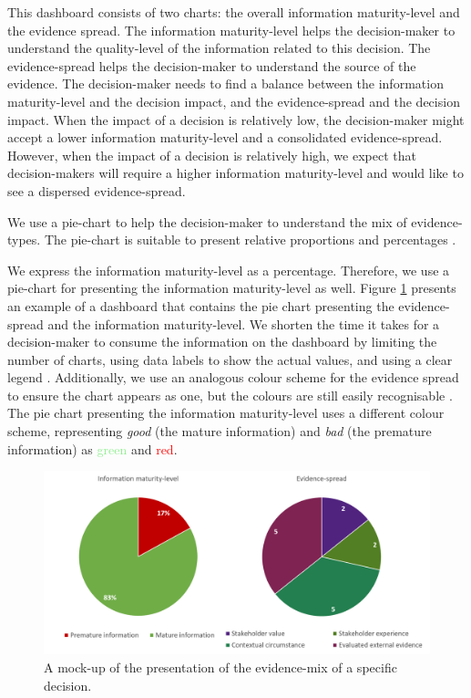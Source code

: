 \begin{center}
\large\color{document}{Is the information ready for an evidence-based decision?}
\end{center}

This dashboard consists of two charts: the overall information maturity-level and the evidence spread. The information maturity-level helps the decision-maker to understand the quality-level of the information related to this decision. The evidence-spread helps the decision-maker to understand the source of the evidence. The decision-maker needs to find a balance between the information maturity-level and the decision impact, and the evidence-spread and the decision impact. When the impact of a decision is relatively low, the decision-maker might accept a lower information maturity-level and a consolidated evidence-spread. However, when the impact of a decision is relatively high, we expect that decision-makers will require a higher information maturity-level and would like to see a dispersed evidence-spread.

We use a pie-chart to help the decision-maker to understand the mix of evidence-types. The pie-chart is suitable to present relative proportions and percentages \parencite{OTH09}.

We express the information maturity-level as a percentage. Therefore, we use a pie-chart for presenting the information maturity-level as well. Figure \ref{fig:Dashboard_Component_1} presents an example of a dashboard that contains the pie chart presenting the evidence-spread and the information maturity-level. We shorten the time it takes for a decision-maker to consume the information on the dashboard by limiting the number of charts, using data labels to show the actual values, and using a clear legend \parencite{BI09}. Additionally, we use an analogous colour scheme for the evidence spread to ensure the chart appears as one, but the colours are still easily recognisable \parencite{BI10}. The pie chart presenting the information maturity-level uses a different colour scheme, representing \emph{good} (the mature information) and \emph{bad} (the premature information) as \textcolor{LightGreen}{green} and \textcolor{Red}{red}.

\begin{figure}[H]
\centering
  \includegraphics[width=14cm]{../../Images/04_Contribution/Dashboard_Component_1.png}
  \caption{A mock-up of the presentation of the evidence-mix of a specific decision.}
  \label{fig:Dashboard_Component_1}
\end{figure} 


